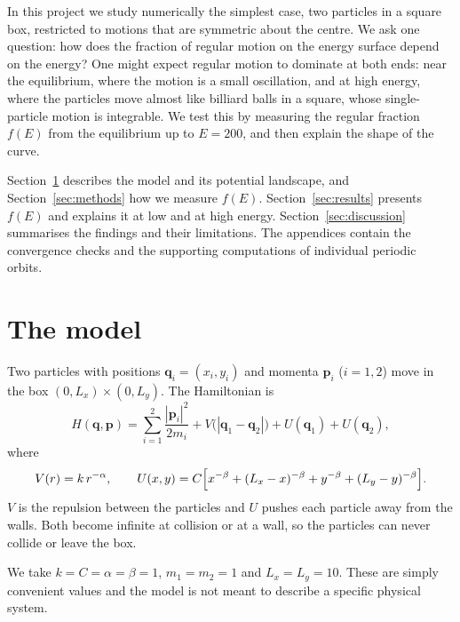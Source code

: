 \documentclass[11pt,a4paper]{article}
\newcommand{\q}{\mathbf{q}}
\newcommand{\p}{\mathbf{p}}
\begin{document}
In this project we study numerically the simplest case, two particles in a
square box, restricted to motions that are symmetric about the centre. We ask
one question: how does the fraction of regular motion on the energy surface
depend on the energy? One might expect regular motion to dominate at both
ends: near the equilibrium, where the motion is a small oscillation, and at
high energy, where the particles move almost like billiard balls in a square,
whose single-particle motion is integrable. We test this by measuring the
regular fraction $f(E)$ from the equilibrium up to $E=200$, and then explain
the shape of the curve.

Section~\ref{sec:model} describes the model and its potential landscape, and
Section~\ref{sec:methods} how we measure $f(E)$. Section~\ref{sec:results}
presents $f(E)$ and explains it at low and at high energy.
Section~\ref{sec:discussion} summarises the findings and their limitations.
The appendices contain the convergence checks and the supporting computations
of individual periodic orbits.

\section{The model}\label{sec:model}

Two particles with positions $\q_i=(x_i,y_i)$ and momenta $\p_i$ ($i=1,2$)
move in the box $(0,L_x)\times(0,L_y)$. The Hamiltonian is
\begin{equation}\label{eq:H}
  H(\q,\p)=\sum_{i=1}^{2}\frac{|\p_i|^2}{2m_i}
  + V\bigl(|\q_1-\q_2|\bigr) + U(\q_1) + U(\q_2),
\end{equation}
where
\begin{equation}\label{eq:potentials}
  V(r)=k\,r^{-\alpha},\qquad
  U(x,y)=C\Bigl[x^{-\beta}+(L_x-x)^{-\beta}+y^{-\beta}+(L_y-y)^{-\beta}\Bigr].
\end{equation}
$V$ is the repulsion between the particles and $U$ pushes each particle away
from the walls. Both become infinite at collision or at a wall, so the
particles can never collide or leave the box.

We take $k=C=\alpha=\beta=1$, $m_1=m_2=1$ and $L_x=L_y=10$. These are simply convenient values and the model is not meant to describe a specific physical system.
\end{document}
